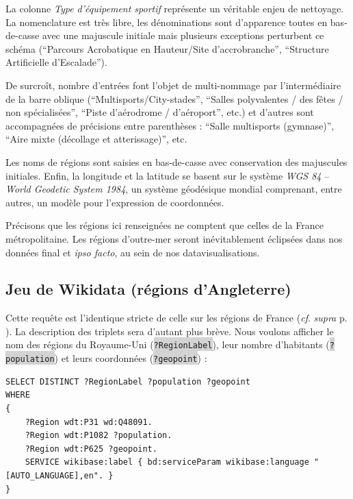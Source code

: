 \documentclass[hidelinks, 12pt]{report}
\newcommand{\code}[1]{\colorbox{LightGray}{\texttt{#1}}}
\begin{document}
La colonne \textit{Type d'équipement sportif} représente un véritable enjeu de nettoyage. La nomenclature est très libre, les dénominations sont d'apparence toutes en bas-de-casse avec une majuscule initiale mais plusieurs exceptions perturbent ce schéma (\enquote{Parcours Acrobatique en Hauteur/Site d'accrobranche}, \enquote{Structure Artificielle d'Escalade}).

De surcroît, nombre d'entrées font l'objet de multi-nommage par l'intermédiaire de la barre oblique (\enquote{Multisports/City-stades}, \enquote{Salles polyvalentes / des fêtes / non spécialisées}, \enquote{Piste d’aérodrome / d'aéroport}, etc.) et d'autres sont accompagnées de précisions entre parenthèses : \enquote{Salle multisports (gymnase)}, \enquote{Aire mixte (décollage et atterissage)}, etc.

Les noms de régions sont saisies en bas-de-casse avec conservation des majuscules initiales. Enfin, la longitude et la latitude se basent sur le système \textit{WGS 84} -- \textit{World Geodetic System 1984}, un système géodésique mondial comprenant, entre autres, un modèle pour l'expression de coordonnées.

\label{rfr}Précisons que les régions ici renseignées ne comptent que celles de la France métropolitaine. Les régions d'outre-mer seront inévitablement éclipsées dans nos données final et \textit{ipso facto}, au sein de nos datavisualisations.





%





\subsection{Jeu de Wikidata (régions d'Angleterre)}

\label{queryeng}Cette requête est l'identique stricte de celle sur les régions de France (\textit{cf}. \textit{supra} p. \pageref{queryfr}). La description des triplets sera d'autant plus brève. Nous voulons afficher le nom des régions du Royaume-Uni (\code{?RegionLabel}), leur nombre d'habitants (\code{?population}) et leurs coordonnées (\code{?geopoint}) :

\begin{lstlisting}[language=SPARQL]
SELECT DISTINCT ?RegionLabel ?population ?geopoint
WHERE
{
	?Region wdt:P31 wd:Q48091.
	?Region wdt:P1082 ?population.
	?Region wdt:P625 ?geopoint.
	SERVICE wikibase:label { bd:serviceParam wikibase:language "[AUTO_LANGUAGE],en". }
}
\end{lstlisting}
\end{document}
